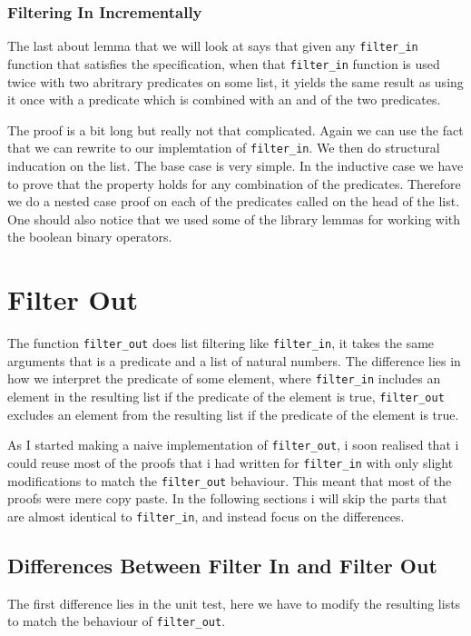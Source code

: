 \documentclass{article}
\begin{document}
\subsubsection{Filtering In Incrementally}
The last about lemma that we will look at says that given any \texttt{filter\_in} function that satisfies the specification, when that \texttt{filter\_in} function is used twice with two abritrary predicates on some list, it yields the same result as using it once with a predicate which is combined with an and of the two predicates.

The proof is a bit long but really not that complicated. Again we can use the fact that we can rewrite to our implemtation of \texttt{filter\_in}. We then do structural inducation on the list. The base case is very simple. In the inductive case we have to prove that the property holds for any combination of the predicates. Therefore we do a nested case proof on each of the predicates called on the head of the list. One should also notice that we used some of the library lemmas for working with the boolean binary operators.

\section{Filter Out}
The function \texttt{filter\_out} does list filtering like \texttt{filter\_in}, it takes the same arguments that is a predicate and a list of natural numbers. The difference lies in how we interpret the predicate of some element, where \texttt{filter\_in} includes an element in the resulting list if the predicate of the element is true, \texttt{filter\_out} excludes an element from the resulting list if the predicate of the element is true.

As I started making a naive implementation of \texttt{filter\_out}, i soon realised that i could reuse most of the proofs that i had written for \texttt{filter\_in} with only slight modifications to match the \texttt{filter\_out} behaviour. This meant that most of the proofs were mere copy paste. In the following sections i will skip the parts that are almost identical to \texttt{filter\_in}, and instead focus on the differences.

\subsection{Differences Between Filter In and Filter Out}
The first difference lies in the unit test, here we have to modify the resulting lists to match the behaviour of \texttt{filter\_out}.
\end{document}
